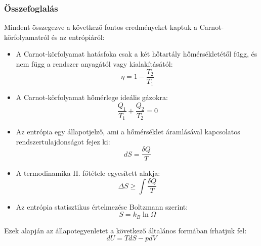 \documentclass[../main.tex]{subfiles}
\begin{document}
\subsubsection*{Összefoglalás}
Mindent összegezve a következő fontos eredményeket kaptuk a Carnot-körfolyamatról és az entrópiáról:
\begin{itemize}
    \item A Carnot-körfolyamat hatásfoka csak a két hőtartály hőmérsékletétől függ, és nem függ a rendszer anyagától vagy kialakításától:
    \begin{equation}
        \eta = 1 - \frac{T_2}{T_1}
    \end{equation}
    \item A Carnot-körfolyamat hőmérlege ideális gázokra:
    \begin{equation}
        \frac{Q_1}{T_1} + \frac{Q_2}{T_2} = 0
    \end{equation}
    \item Az entrópia egy állapotjelző, ami a hőmérséklet áramlásával kapcsolatos rendszertulajdonságot fejez ki:
    \begin{equation}
        dS = \frac{\delta Q}{T}
    \end{equation}
    \item A termodinamika II. főtétele egyesített alakja:
    \begin{equation}
        \Delta S \geq \int \frac{\delta Q}{T}
    \end{equation}
    \item Az entrópia statisztikus értelmezése Boltzmann szerint:
    \begin{equation}
        S = k_B \ln{\Omega}
    \end{equation}
\end{itemize}

Ezek alapján az állapotegyenletet a következő általános formában írhatjuk fel:
\begin{equation}
    \boxed{dU = T dS - p dV}
\end{equation}
\end{document}
